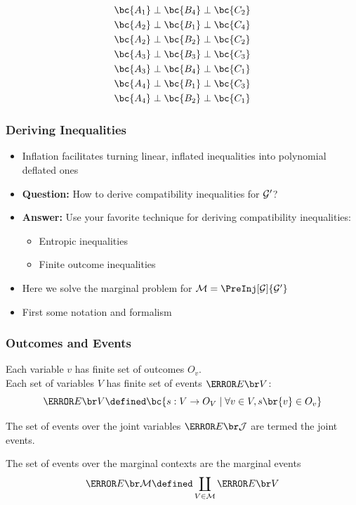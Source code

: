 \documentclass[
    hyperref={bookmarks=false},%
    xcolor={dvipsnames},
]{beamer}
\renewcommand{\term}[1]{\textcolor{Mahogany}{#1}}
\begin{document}
\begin{frame}
\begin{equation*}
\begin{gathered}
            \bc{A_1} \ancestralindep \bc{B_4} \ancestralindep \bc{C_2} \\
            \bc{A_2} \ancestralindep \bc{B_1} \ancestralindep \bc{C_4} \\
            \bc{A_2} \ancestralindep \bc{B_2} \ancestralindep \bc{C_2} \\
            \bc{A_3} \ancestralindep \bc{B_3} \ancestralindep \bc{C_3} \\
            \bc{A_3} \ancestralindep \bc{B_4} \ancestralindep \bc{C_1} \\
            \bc{A_4} \ancestralindep \bc{B_1} \ancestralindep \bc{C_3} \\
            \bc{A_4} \ancestralindep \bc{B_2} \ancestralindep \bc{C_1}
        \end{gathered}
    \end{equation*}
\end{frame}

\begin{frame}
    \frametitle{Deriving Inequalities}
    \begin{itemize}
        \item Inflation facilitates turning linear, inflated inequalities into polynomial deflated ones
        \item \textbf{Question:} How to derive compatibility inequalities for $\mathcal{G}'$?
        \item \textbf{Answer:} Use your favorite technique for deriving compatibility inequalities:
        \begin{itemize}
            \item Entropic inequalities
            \item Finite outcome inequalities
        \end{itemize}
        \item Here we solve the marginal problem for $\mscenario = \PreInj[\graph]{\graph'}$
        \item First some notation and formalism
    \end{itemize}
\end{frame}

\begin{frame}
    \frametitle{Outcomes and Events}
    \begin{definition}
        Each variable $v$ has finite set of \term{outcomes} $O_v$. \\
        Each set of variables $V$ has finite set of \term{events} $\Events{V}$:
        \[ \Events{V} \defined \bc{s: V \to O_V \mid \forall v \in V, s\br{v} \in O_v} \]
    \end{definition}
    \begin{definition}
        The set of events over the joint variables $\Events{\jointvar}$ are termed the \term{joint events}.
    \end{definition}
    \begin{definition}
        The set of events over the marginal contexts are the \term{marginal events}
        \[ \Events{\mscenario} \defined \coprod_{V \in \mscenario} \Events{V} \]
    \end{definition}
\end{frame}
\end{document}
